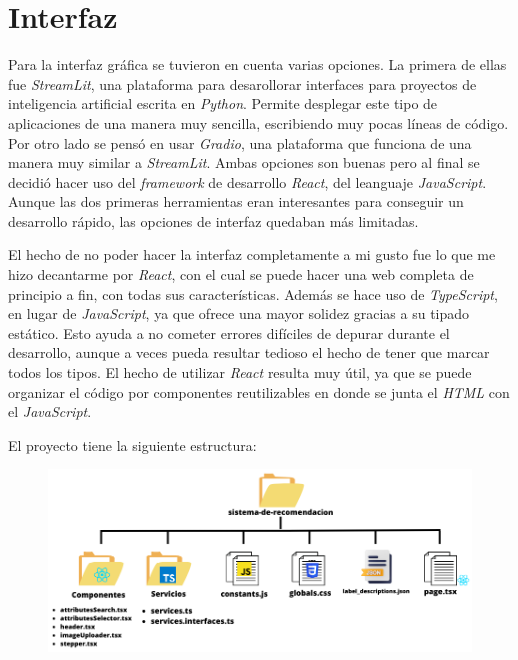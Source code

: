 \documentclass[12pt]{report} %
\begin{document}
	\section{Interfaz}

	Para la interfaz gráfica se tuvieron en cuenta varias opciones. La primera de ellas fue \textit{StreamLit}, una plataforma
	para desarollorar interfaces para proyectos de inteligencia artificial escrita en \textit{Python}. Permite desplegar este
	tipo de aplicaciones de una manera muy sencilla, escribiendo muy pocas líneas de código. Por otro lado se pensó en usar
	\textit{Gradio}, una plataforma que funciona de una manera muy similar a \textit{StreamLit}. Ambas opciones son buenas
	pero al final se decidió hacer uso del \textit{framework} de desarrollo \textit{React}, del leanguaje \textit{JavaScript}.
	Aunque las dos primeras herramientas eran interesantes para conseguir un desarrollo rápido, las opciones de interfaz quedaban más limitadas.

	El hecho de no poder hacer la interfaz completamente a mi gusto fue lo que me hizo decantarme por \textit{React}, con el cual
	se puede hacer una web completa de principio a fin, con todas sus características. Además se hace uso de \textit{TypeScript}, en lugar
	de \textit{JavaScript}, ya que ofrece una mayor solidez gracias a su tipado estático. Esto ayuda a no cometer errores difíciles de
	depurar durante el desarrollo, aunque a veces pueda resultar tedioso el hecho de tener que marcar todos los tipos. El hecho de utilizar
	\textit{React} resulta muy útil, ya que se puede organizar el código por componentes reutilizables en donde se junta el \textit{HTML}
	con el \textit{JavaScript}.

	El proyecto tiene la siguiente estructura:
	\begin{figure}[H]
		{\includegraphics[scale=0.6]{estructura-carpetas.png}}
	\end{figure}
\end{document}
